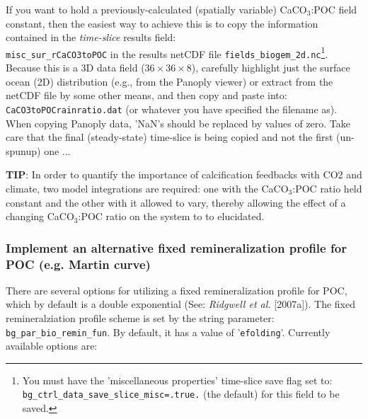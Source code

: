\documentclass[11pt,fleqn]{book} %
\begin{document}
If you want to hold a previously-calculated (spatially variable) CaCO\begin{math}_3\end{math}:POC field constant, then the easiest way to achieve this is to copy the information contained in the \textit{time-slice} results field:\\
\texttt{misc\_sur\_rCaCO3toPOC} in the results netCDF file \texttt{fields\_biogem\_2d.nc}\footnote{You must have the 'miscellaneous properties' time-slice save flag set to:\\
\texttt{bg\_ctrl\_data\_save\_slice\_misc=.true.} (the default) for this field to be saved.}. Because this is a 3D data field (\begin{math}36\times36\times8\end{math}), carefully highlight just the surface ocean (2D) distribution (e.g., from the Panoply viewer) or extract from the netCDF file by some other means, and then copy and paste into:\\
\texttt{CaCO3toPOCrainratio.dat} (or whatever you have specified the filename as). When copying Panoply data, 'NaN's should be replaced by values of zero. Take care that the final (steady-state) time-slice is being copied and not the first (un-spunup) one ...

\textbf{TIP}: In order to quantify the importance of calcification feedbacks with CO2 and climate, two model integrations are required: one with the CaCO\begin{math}_3\end{math}:POC ratio held constant and the other with it allowed to vary, thereby allowing the effect of a changing CaCO\begin{math}_3\end{math}:POC ratio on the system to to elucidated.

%
\subsubsection{Implement an alternative fixed remineralization profile for POC (e.g. Martin curve)}
\vspace{1mm}

There are several options for utilizing a fixed remineralization profile for POC, which by default is a double exponential (See: \textit{Ridgwell et al.} [2007a]).
The fixed remineralziation profile scheme is set by the string parameter: \texttt{bg\_par\_bio\_remin\_fun}. By default, it has a value of '\texttt{efolding}'. Currently available options are:
\end{document}
